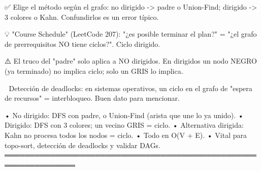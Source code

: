 \begin{dsaentrevistas}

✅ Elige el método según el grafo: no dirigido -> padre o Union-Find;
   dirigido -> 3 colores o Kahn. Confundirlos es un error típico.

💡 "Course Schedule" (LeetCode 207): "¿es posible terminar el plan?" =
   "¿el grafo de prerrequisitos NO tiene ciclos?". Ciclo dirigido.

⚠️ El truco del "padre" solo aplica a NO dirigidos. En dirigidos un
   nodo NEGRO (ya terminado) no implica ciclo; solo un GRIS lo implica.

🔑 Detección de deadlocks: en sistemas operativos, un ciclo en el grafo
   de "espera de recursos" = interbloqueo. Buen dato para mencionar.

\end{dsaentrevistas}

\begin{dsaresumen}

• No dirigido: DFS con padre, o Union-Find (arista que une lo ya unido).
• Dirigido: DFS con 3 colores; un vecino GRIS = ciclo.
• Alternativa dirigida: Kahn no procesa todos los nodos = ciclo.
• Todo en O(V + E).
• Vital para topo-sort, detección de deadlocks y validar DAGs.
════════════════════════════════════════════════════════════════

\end{dsaresumen}
